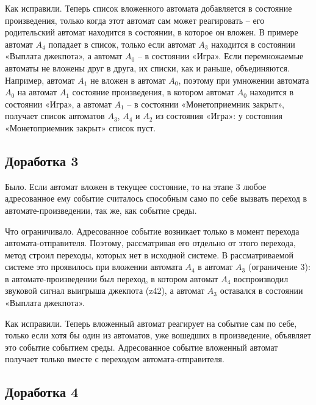 \documentclass[12pt]{article}
\begin{document}
Как исправили. Теперь список вложенного автомата добавляется в состояние произведения, только когда этот автомат сам может реагировать – его родительский автомат находится в состоянии, в которое он вложен. В примере автомат $A_{4}$ попадает в список, только если автомат $A_{3}$ находится в состоянии «Выплата джекпота», а автомат $A_{0}$ – в состоянии «Игра». Если перемножаемые автоматы не вложены друг в друга, их списки, как и раньше, объединяются. Например, автомат $A_{1}$ не вложен в автомат $A_{0}$, поэтому при умножении автомата $A_{0}$ на автомат $A_{1}$ состояние произведения, в котором автомат $A_{0}$ находится в состоянии «Игра», а автомат $A_{1}$ – в состоянии «Монетоприемник закрыт», получает список автоматов $A_{3}$, $A_{4}$ и $A_{2}$ из состояния «Игра»: у состояния «Монетоприемник закрыт» список пуст.

\subsection*{Доработка 3}

Было. Если автомат вложен в текущее состояние, то на этапе 3 любое адресованное ему событие считалось способным само по себе вызвать переход в автомате-произведении, так же, как событие среды.

Что ограничивало. Адресованное событие возникает только в момент перехода автомата-отправителя. Поэтому, рассматривая его отдельно от этого перехода, метод строил переходы, которых нет в исходной системе. В рассматриваемой системе это проявилось при вложении автомата $A_{4}$ в автомат $A_{3}$ (ограничение 3): в автомате-произведении был переход, в котором автомат $A_{4}$ воспроизводил звуковой сигнал выигрыша джекпота (z42), а автомат $A_{3}$ оставался в состоянии «Выплата джекпота».

Как исправили. Теперь вложенный автомат реагирует на событие сам по себе, только если хотя бы один из автоматов, уже вошедших в произведение, объявляет это событие событием среды. Адресованное событие вложенный автомат получает только вместе с переходом автомата-отправителя.

\subsection*{Доработка 4}
\end{document}
